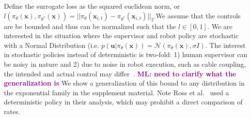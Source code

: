 \documentclass[10pt, conference]{ieeeconf}      %
\newcommand{\bu}{\mathbf{u}}
\newcommand{\bx}{\mathbf{x}}
\newcommand{\mlnote}[1]{\ifthenelse{ \boolean{include-notes}}%
 {\textcolor{purple}{\textbf{ML: #1}}}{}}
\begin{document}
 Define the surrogate loss as the squared euclidean norm, or $l(\pi_{\theta}(\bx),\pi_{\theta^*}(\bx)) = ||\pi_{\theta}(\bx_{i,t}) - \pi_{\theta^*}(\bx_{i,t})||_2$.We assume that the controls are be bounded and thus can be normalized such that the $l \in [0,1]$.  We are interested in the situation where the supervisor and robot policy are stochastic with a Normal Distribution (i.e. $p(\bu|\pi_{\theta}(\bx)) = \mathcal{N}(\pi_\theta(\bx),\sigma I)$. The interest in stochastic policies instead of deterministic is two-fold: 1) human supervisor can be noisy in nature and 2) due to noise in robot execution, such as cable coupling, the intended and actual control may differ~\cite{mahler2014learning}. \mlnote{need to clarify what the generalization is} We show a generalization of this bound to any distribution in the exponential family in the supplement material.  Note Ross et al.~\cite{ross2010reduction} used a deterministic policy in their analysis, which may prohibit a direct comparison of rates.
 
\end{document}
